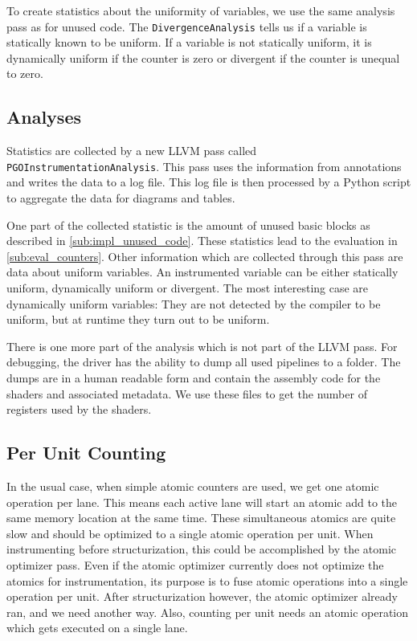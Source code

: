 To create statistics about the uniformity of variables, we use the same analysis pass as for unused code.
The \texttt{DivergenceAnalysis} tells us if a variable is statically known to be uniform.
If a variable is not statically uniform, it is dynamically uniform if the counter is zero or divergent if the counter is unequal to zero.

\subsection{Analyses}
\label{sub:impl_analysis}
Statistics are collected by a new LLVM pass called \texttt{PGOInstrumentationAnalysis}.
This pass uses the information from annotations and writes the data to a log file.
This log file is then processed by a Python script to aggregate the data for diagrams and tables.

One part of the collected statistic is the amount of unused basic blocks as described in \cref{sub:impl_unused_code}.
These statistics lead to the evaluation in \cref{sub:eval_counters}.
Other information which are collected through this pass are data about uniform variables.
An instrumented variable can be either statically uniform, dynamically uniform or divergent.
The most interesting case are dynamically uniform variables: They are not detected by the compiler to be uniform, but at runtime they turn out to be uniform.

There is one more part of the analysis which is not part of the LLVM pass.
For debugging, the driver has the ability to dump all used pipelines to a folder.
The dumps are in a human readable form and contain the assembly code for the shaders and associated metadata.
We use these files to get the number of registers used by the shaders.

\subsection{Per Unit Counting}
\label{sub:impl_per_unit}
In the usual case, when simple atomic counters are used, we get one atomic operation per lane.
This means each active lane will start an atomic add to the same memory location at the same time.
These simultaneous atomics are quite slow and should be optimized to a single atomic operation per unit.
When instrumenting before structurization, this could be accomplished by the atomic optimizer pass.
Even if the atomic optimizer currently does not optimize the atomics for instrumentation, its purpose is to fuse atomic operations into a single operation per unit.
After structurization however, the atomic optimizer already ran, and we need another way.
Also, counting per unit needs an atomic operation which gets executed on a single lane.

